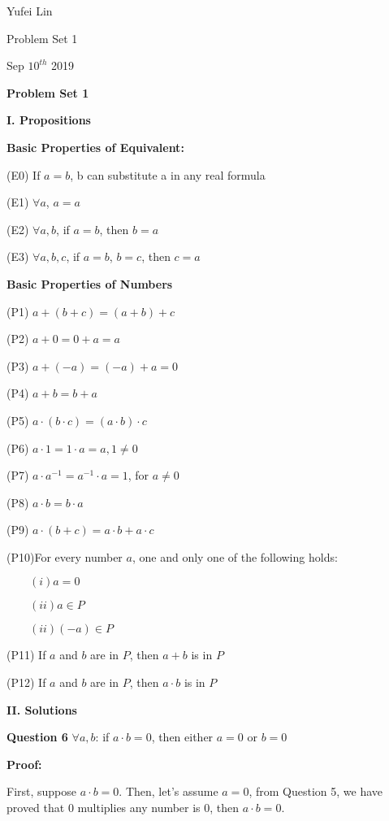\documentclass[a4paper,12pt]{report}
\begin{document}
\noindent
Yufei Lin

\noindent
Problem Set 1

\noindent
Sep \(10^{th}\) 2019

\begin{center}
\textbf{Problem Set 1}
\end{center}

\noindent
\textbf{I. Propositions}

\noindent
\textbf{Basic Properties of Equivalent:}

(E0) If $a=b$, b can substitute a in any real formula

(E1) $\forall a$, $a=a$

(E2) $\forall a,b$, if $a = b$, then $b =a$

(E3) $\forall a,b,c$, if $a=b$, $b=c$, then $c=a$

\noindent
\textbf{Basic Properties of Numbers}

(P1) $a+(b+c)=(a+b)+c$

(P2) $a+0=0+a=a$

(P3) $a+(-a)=(-a)+a=0$

(P4) $a+b=b+a$

(P5) $a \cdot{(b \cdot{c})}=(a \cdot{b}) \cdot{c}$

(P6) $a \cdot{1}=1\cdot{a}=a, 1\neq0$

(P7) $a\cdot{a^{-1}}=a^{-1}\cdot{a}=1$, for $a \neq 0$

(P8) $a\cdot{b} = b\cdot{a}$

(P9) $a \cdot{(b+c)} = a\cdot{b} +a\cdot{c}$

(P10)For every number $a$, one and only one of the following holds:

    $\qquad (i) a=0$
    
    $\qquad (ii) a\in P$
    
    $\qquad (ii) (-a)\in P$

(P11) If $a$ and $b$ are in $P$, then $a+b$ is in $P$

(P12) If $a$ and $b$ are in $P$, then $a\cdot{b}$ is in $P$

\noindent
\textbf{II. Solutions}

\noindent
\textbf{Question 6} $\forall a,b$: if $a \cdot{b} = 0$, then either $a=0$ or $b=0$

\noindent
\textbf{Proof:}

\noindent
First, suppose $a\cdot{b}=0$. Then, let's assume $a=0$, from Question 5, we have proved that 0 multiplies any number is 0, then $a\cdot{b}=0$.
\end{document}
